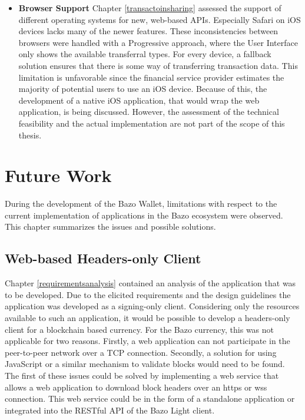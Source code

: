 \begin{itemize}
\item \textbf{Browser Support} 
Chapter \ref{transactoinsharing} assessed the support of different operating systems for new, web-based APIs. Especially Safari on iOS devices lacks many of the newer features. These inconsistencies between browsers were handled with a Progressive approach, where the User Interface only shows the available transferral types. For every device, a fallback solution ensures that there is some way of transferring transaction data.
This limitation is unfavorable since the financial service provider estimates the majority of potential users to use an iOS device. Because of this, the development of a native iOS application, that would wrap the web application, is being discussed. However, the assessment of the technical feasibility and the actual implementation are not part of the scope of this thesis.

\end{itemize}

\newpage

\chapter{Future Work}\label{futurework}
During the development of the Bazo Wallet, limitations with respect to the current implementation of applications in the Bazo ecosystem were observed. This chapter summarizes the issues and possible solutions.

\section{Web-based Headers-only Client}
Chapter \ref{requirementsanalysis} contained an analysis of the application that was to be developed. Due to the elicited requirements and the design guidelines the application was developed as a signing-only client. Considering only the resources available to such an application, it would be possible to develop a headers-only client for a blockchain based currency. For the Bazo currency, this was not applicable for two reasons. Firstly, a web application can not participate in the peer-to-peer network over a TCP connection. Secondly, a solution for using JavaScript or a similar mechanism to validate blocks would need to be found. The first of these issues could be solved by implementing a web service that allows a web application to download block headers over an https or wss connection. This web service could be in the form of a standalone application or integrated into the RESTful API of the Bazo Light client.%

